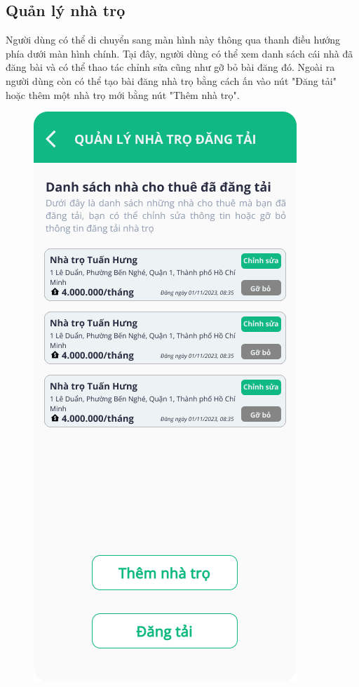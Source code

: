 \subsection{Quản lý nhà trọ}
Người dùng có thể di chuyển sang màn hình này thông qua thanh điều hướng phía dưới màn hình chính. Tại đây, người dùng có thể xem danh sách cái nhà đã đăng bài và có thể thao tác chỉnh sửa cũng như gỡ bỏ bài đăng đó. Ngoài ra người dùng còn có thể tạo bài đăng nhà trọ bằng cách ấn vào nút "Đăng tải" hoặc thêm một nhà trọ mới bằng nút "Thêm nhà trọ".
\begin{figure}[!htb]
\centering
   \begin{minipage}{0.32\textwidth}
     \centering
     \includegraphics[width=1\linewidth]{Images/UI figma/Upload Rooming House 5.png}

\end{minipage}
\end{figure}
